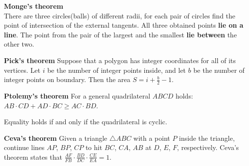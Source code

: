 \textbf{Monge's theorem}\\
There are three circles(balls) of different radii, 
for each pair of circles find the point of intersection of the external tangents. 
All three obtained points \textbf{lie on a line}. 
The point from the pair of the largest and the smallest \textbf{lie between} the other two.

\textbf{Pick's theorem}
Suppose that a polygon has integer coordinates for all of its vertices. 
Let $i$ be the number of integer points inside, and let $b$ be the number of integer points on boundary. 
Then the area $S = i + \tfrac{b}{2} - 1$.

\textbf{Ptolemy's theorem}
For a general quadrilateral $ABCD$ holds:
$AB \cdot CD + AD \cdot BC \ge AC \cdot BD$.

Equality holds if and only if the quadrilateral is cyclic.

\textbf{Ceva's theorem}
Given a triangle $\triangle ABC$ with a point $P$ inside the triangle,
continue lines $AP$, $BP$, $CP$ to hit $BC$, $CA$, $AB$ at $D$, $E$, $F$,
respectively.
Ceva's theorem states that
$\frac{AF}{FB} \cdot \frac{BD}{DC} \cdot \frac{CE}{EA} = 1$. 

